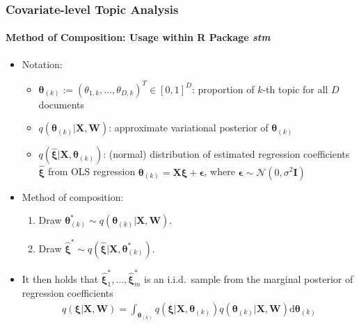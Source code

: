 \documentclass[xcolor=dvipsnames]{beamer}
\begin{document}
\begin{frame}
\frametitle{Covariate-level Topic Analysis}
\framesubtitle{Method of Composition: Usage within R Package \textit{stm}}
\begin{itemize}
\item Notation:
\begin{itemize}
\item $\boldsymbol{\theta}_{(k)}:=(\theta_{1,k}, \dots, \theta_{D,k})^T \in [0,1]^{D}$: proportion of $k$-th topic for all $D$ documents
\item $q(\boldsymbol{\theta}_{(k)} | \boldsymbol{X}, \boldsymbol{W})$: approximate variational posterior of $\boldsymbol{\theta}_{(k)}$
\item $q(\hat{\boldsymbol{\xi}} | \boldsymbol{X}, \boldsymbol{\theta}_{(k)})$: (normal) distribution of estimated regression coefficients $\hat{\boldsymbol{\xi}}$ from OLS regression $\boldsymbol{\theta}_{(k)} = \boldsymbol{X}\boldsymbol{\xi} + \boldsymbol{\epsilon}$, where $\boldsymbol{\epsilon} \sim \mathcal{N}(0,\sigma^2\boldsymbol{I})$
\end{itemize}
\item Method of composition:
\begin{enumerate}[{1)}]
\item Draw $\boldsymbol{\theta}_{(k)}^* \sim q(\boldsymbol{\theta}_{(k)} | \boldsymbol{X}, \boldsymbol{W})$.
\item Draw $\hat{\boldsymbol{\xi}}^* \sim q(\hat{\boldsymbol{\xi}} | \boldsymbol{X}, \boldsymbol{\theta}_{(k)}^*)$.
\end{enumerate}
\item It then holds that $\hat{\boldsymbol{\xi}}_1^*, \dots, \hat{\boldsymbol{\xi}}_m^*$ is an i.i.d.\ sample from the marginal posterior of regression coefficients
\begin{align*}
q(\boldsymbol{\xi} | \boldsymbol{X}, \boldsymbol{W}) = \int_{\boldsymbol{\theta}_{(k)}} q(\boldsymbol{\xi} | \boldsymbol{X}, \boldsymbol{\theta}_{(k)}) q(\boldsymbol{\theta}_{(k)} | \boldsymbol{X}, \boldsymbol{W}) \text{d} \boldsymbol{\theta}_{(k)} 
\end{align*}
\end{itemize}
\end{frame}
\end{document}
